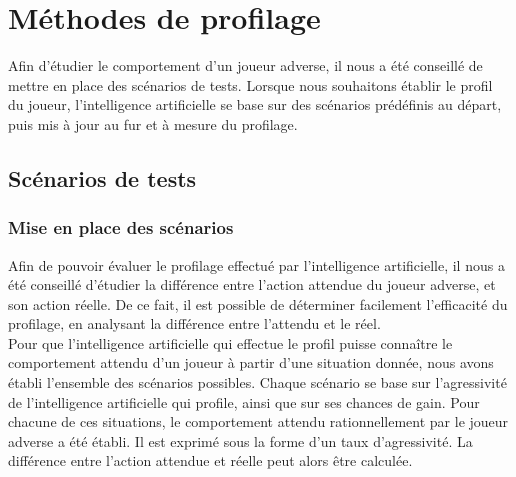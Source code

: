 \documentclass{report}
\begin{document}
\chapter{Méthodes de profilage}

\hspace{0.5cm}Afin d'étudier le comportement d'un joueur adverse, il nous a été conseillé de mettre en place des scénarios de tests. Lorsque nous souhaitons établir le profil du joueur, l'intelligence artificielle se base sur des scénarios prédéfinis au départ, puis mis à jour au fur et à mesure du profilage.

\section{Scénarios de tests}

\subsection{Mise en place des scénarios}

\hspace{0.5cm}Afin de pouvoir évaluer le profilage effectué par l'intelligence artificielle, il nous a été conseillé d'étudier la différence entre l'action attendue du joueur adverse, et son action réelle. De ce fait, il est possible de déterminer facilement l'efficacité du profilage, en analysant la différence entre l'attendu et le réel.\\

Pour que l'intelligence artificielle qui effectue le profil puisse connaître le comportement attendu d'un joueur à partir d'une situation donnée, nous avons établi l'ensemble des scénarios possibles. Chaque scénario se base sur l'agressivité de l'intelligence artificielle qui profile, ainsi que sur ses chances de gain. Pour chacune de ces situations, le comportement attendu rationnellement par le joueur adverse a été établi. Il est exprimé sous la forme d'un taux d'agressivité. La différence entre l’action attendue et réelle peut alors être calculée.
\end{document}
